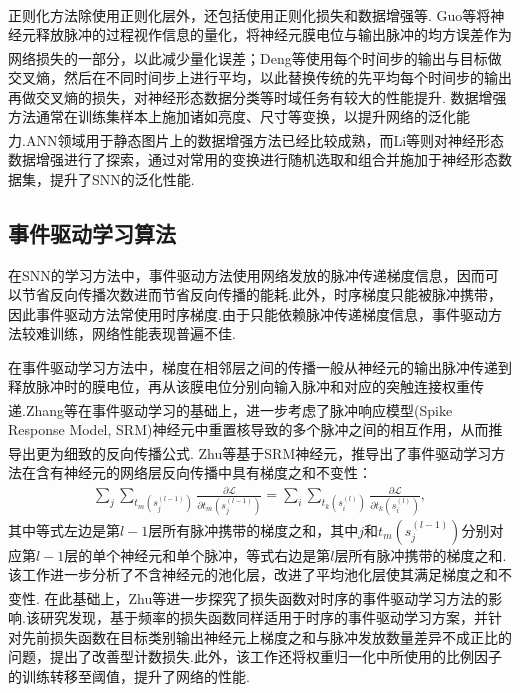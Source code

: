 \documentclass[10.5pt,compsoc,UTF8]{CjC}
\theoremstyle{mystyle}
\newcommand{\upcite}[1]{\textsuperscript{\cite{#1}}}
\begin{document}
\begin{multicols}{1}
正则化方法除使用正则化层外，还包括使用正则化损失和数据增强等.
Guo等\upcite{Guo_2023_ICCV_rmp}将神经元释放脉冲的过程视作信息的量化，将神经元膜电位与输出脉冲的均方误差作为网络损失的一部分，以此减少量化误差；Deng等\upcite{deng2022temporal}使用每个时间步的输出与目标做交叉熵，然后在不同时间步上进行平均，以此替换传统的先平均每个时间步的输出再做交叉熵的损失，对神经形态数据分类等时域任务有较大的性能提升.
数据增强方法通常在训练集样本上施加诸如亮度、尺寸等变换，以提升网络的泛化能力.ANN领域用于静态图片上的数据增强方法已经比较成熟，而Li等\upcite{li2022neuromorphic}则对神经形态数据增强进行了探索，通过对常用的变换进行随机选取和组合并施加于神经形态数据集，提升了SNN的泛化性能.





\subsection{事件驱动学习算法}%


在SNN的学习方法中，事件驱动方法使用网络发放的脉冲传递梯度信息，因而可以节省反向传播次数进而节省反向传播的能耗.此外，时序梯度只能被脉冲携带，因此事件驱动方法常使用时序梯度.由于只能依赖脉冲传递梯度信息，事件驱动方法较难训练，网络性能表现普遍不佳.



在事件驱动学习方法中，梯度在相邻层之间的传播一般从神经元的输出脉冲传递到释放脉冲时的膜电位，再从该膜电位分别向输入脉冲和对应的突触连接权重传递.Zhang等\upcite{zhang2020temporal}在事件驱动学习的基础上，进一步考虑了脉冲响应模型(Spike Response Model, SRM)神经元中重置核导致的多个脉冲之间的相互作用，从而推导出更为细致的反向传播公式.
Zhu等\upcite{zhu2022training}基于SRM神经元，推导出了事件驱动学习方法在含有神经元的网络层反向传播中具有梯度之和不变性：
\begin{align}
	\sum_j \sum_{t_m(s_j^{(l-1)})} \frac{\partial \mathcal{L}}{\partial t_m(s_j^{(l-1)})} = 
	\sum_i \sum_{t_k(s_i^{(l)})} \frac{\partial \mathcal{L}}{\partial t_k(s_i^{(l)})},
\end{align}
其中等式左边是第$l-1$层所有脉冲携带的梯度之和，其中$j$和$t_m(s_j^{(l-1)})$分别对应第$l-1$层的单个神经元和单个脉冲，等式右边是第$l$层所有脉冲携带的梯度之和.
该工作进一步分析了不含神经元的池化层，改进了平均池化层使其满足梯度之和不变性.
在此基础上，Zhu等\upcite{zhu2024exploring}进一步探究了损失函数对时序的事件驱动学习方法的影响.该研究发现，基于频率的损失函数同样适用于时序的事件驱动学习方案，并针对先前损失函数在目标类别输出神经元上梯度之和与脉冲发放数量差异不成正比的问题，提出了改善型计数损失.此外，该工作还将权重归一化中所使用的比例因子的训练转移至阈值，提升了网络的性能.



\end{multicols}
\end{document}
